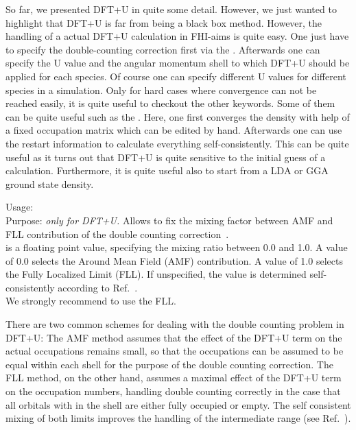 So far, we presented DFT+U in quite some detail. However, we just wanted to highlight that DFT+U is far from being a black box method. However, the handling of a actual  DFT+U calculation in FHI-aims is quite easy. One just have to specify  the double-counting correction first via the . Afterwards one can specify the U value and the angular momentum shell to which DFT+U should be applied for each species. Of course one can specify different U values for different species in a simulation. Only for hard cases where convergence can not be reached easily, it is quite useful to checkout the other keywords. Some of them can be quite useful such as the . Here, one first converges the density with help of a fixed occupation matrix which can be edited by hand. Afterwards one can use the restart information to calculate everything self-consistently. This can be quite useful as it turns out that DFT+U is quite sensitive to the initial guess of a calculation. Furthermore, it is quite useful also to start from a LDA or GGA ground state density.

{
  \noindent
  Usage:   \\[1.0ex]
  Purpose: \emph{only for DFT+U.} Allows to fix the mixing
    factor between AMF and FLL contribution of the double counting
    correction~\cite{Petukhov03}. \\[1.0ex] 
   is a floating point value, specifying the mixing
    ratio between 0.0 and 1.0. A value of 0.0 selects the Around Mean Field
    (AMF) contribution. A value of 1.0 selects the Fully Localized Limit
    (FLL). If unspecified, the value is determined self-consistently according
    to Ref.~\cite{Petukhov03}. \\ 
    We strongly recommend to use the FLL.\\
}

There are two common schemes for dealing with the double counting problem in DFT+U: The AMF method
assumes that the effect of the DFT+U term on the actual occupations remains small, so that the
occupations can be assumed to be equal within each shell for the purpose of the double counting
correction. The FLL method, on the other hand, assumes a maximal effect of the DFT+U term on the
occupation numbers, handling double counting correctly in the case that all orbitals with in the
shell are either fully occupied or empty. The self consistent mixing of both limits improves the
handling of the intermediate range (see Ref.~\cite{Petukhov03}).

